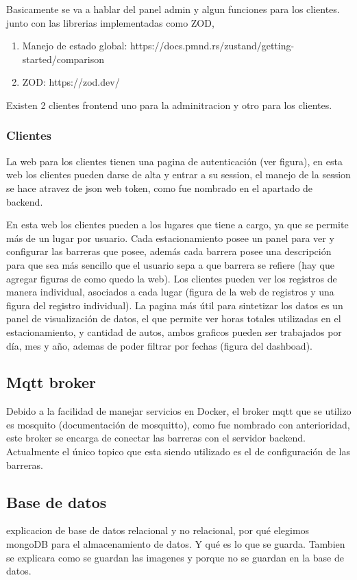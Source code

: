 Basicamente se va a hablar del panel admin y algun funciones para los clientes. junto con las librerias implementadas como ZOD,

\begin{enumerate}
        \item Manejo de estado global: https://docs.pmnd.rs/zustand/getting-started/comparison
        \item ZOD: https://zod.dev/
\end{enumerate}

Existen 2 clientes frontend uno para la adminitracion y otro para los clientes.

\subsubsection{Clientes}

La web para los clientes tienen una pagina de autenticación (ver figura), en esta web los clientes pueden darse de alta y entrar a su session, el manejo de la session se hace atravez de json web token, como fue nombrado en el apartado de backend.

En esta web los clientes pueden a los lugares que tiene a cargo, ya que se permite más de un lugar por usuario. Cada estacionamiento posee un panel para ver y configurar las barreras que posee, además cada barrera posee una descripción para que sea más sencillo que el usuario sepa a que barrera se refiere (hay que agregar figuras de como quedo la web). Los clientes pueden ver los registros de manera individual, asociados a cada lugar (figura de la web de registros y una figura del registro individual). La pagina más útil para sintetizar los datos es un panel de visualización de datos, el que permite ver horas totales utilizadas en el estacionamiento, y cantidad de autos, ambos graficos pueden ser trabajados por día, mes y año, ademas de poder filtrar por fechas (figura del dashboad).

\subsection{Mqtt broker}

Debido a la facilidad de manejar servicios en Docker, el broker mqtt que se utilizo es mosquito (documentación de mosquitto), como fue nombrado con anterioridad, este broker se encarga de conectar las barreras con el servidor backend. Actualmente el único topico que esta siendo utilizado es el de configuración de las barreras.
\subsection{Base de datos}

explicacion de base de datos relacional y no relacional, por qué elegimos mongoDB para el almacenamiento de datos. Y qué es lo que se guarda. Tambien se explicara como se guardan las imagenes y porque no se guardan en la base de datos.




